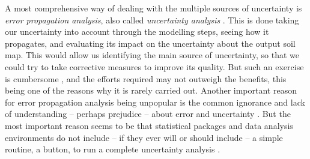 A most comprehensive way of dealing with the multiple sources of uncertainty is \emph{error propagation 
analysis}, also called \emph{uncertainty analysis} \cite{HeuvelinkEtAl1989, Taylor1997}. This is done taking
our uncertainty into account through the modelling steps, seeing how it propagates, and
evaluating its impact on the uncertainty about the output soil map. This would allow us identifying the
main source of uncertainty, so that we could try to take corrective measures to improve its quality.
But such an exercise is cumbersome \cite{NelsonEtAl2011}, and the efforts required may not
outweigh the benefits, this being one of the reasons why it is rarely carried out. Another important
reason for error propagation analysis being unpopular is the common ignorance and lack of
understanding -- perhaps prejudice -- about error and uncertainty \cite{Wechsler2003, Heuvelink2005}.
But the most important reason seems to be that statistical packages and data analysis environments do
not include -- if they ever will or should include -- a simple routine, a button, to run a complete
uncertainty analysis \cite{HeuvelinkEtAl2006b}.


